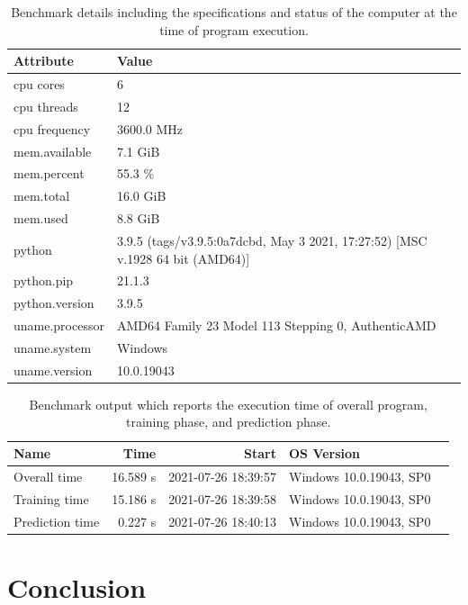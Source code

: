 \begin{table}[htb]
\caption{Benchmark details including the specifications and status of the computer at the time of program execution.}
\label{tab:resource}
\begin{tabular}{p{2cm}p{5cm}}
Attribute        & Value  \\
\hline
 cpu cores        & 6    \\
 cpu threads      & 12    \\
 cpu frequency    & 3600.0 MHz      \\
 mem.available    & 7.1 GiB \\
 mem.percent      & 55.3 \%  \\
 mem.total        & 16.0 GiB \\
 mem.used         & 8.8 GiB  \\
 python           & 3.9.5 (tags/v3.9.5:0a7dcbd, May  3 2021, 17:27:52) [MSC v.1928 64 bit (AMD64)]  \\
 python.pip       & 21.1.3   \\
 python.version   & 3.9.5 \\
 uname.processor  & AMD64 Family 23 Model 113 Stepping 0, AuthenticAMD   \\
 uname.system     & Windows \\
 uname.version    & 10.0.19043 \\
 \hline
 \end{tabular}
 \end{table}


\begin{table}[htb]
\caption{Benchmark output which reports the execution time of overall program, training phase, and prediction phase.}
\label{tab:second}
\begin{tabular}{lrrll}
Name            &   Time   & Start               & OS Version \\
\hline
 Overall time    & 16.589 s & 2021-07-26 18:39:57 & Windows  10.0.19043, SP0 \\
Training time   & 15.186 s & 2021-07-26 18:39:58 & Windows 10.0.19043, SP0 \\
 Prediction time &  0.227 s & 2021-07-26 18:40:13 & Windows 10.0.19043, SP0 \\
 \hline
 \end{tabular}
 \end{table}
 
\section{Conclusion}

